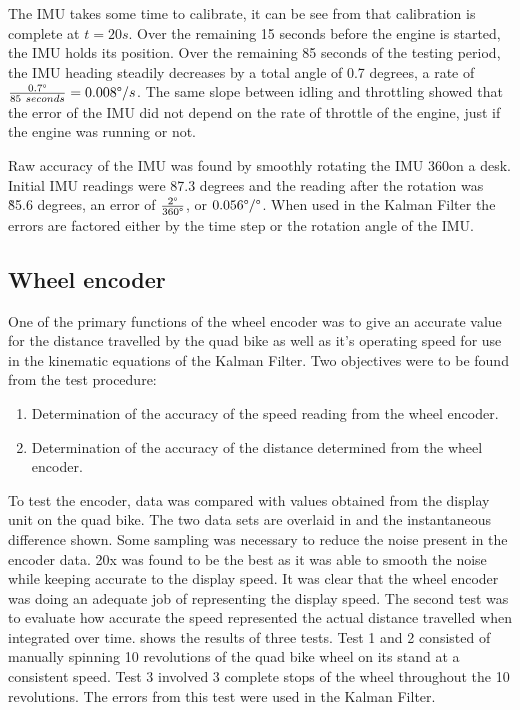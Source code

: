\documentclass[main.tex]{subfiles}
\begin{document}
The IMU takes some time to calibrate, it can be see from  that calibration is complete at $t=20s$. Over the remaining 15 seconds before the engine is started, the IMU holds its position. Over the remaining 85 seconds of the testing period, the IMU heading steadily decreases by a total angle of 0.7 degrees, a rate of $\frac{0.7\degree}{85\ seconds} = 0.008 \degree/s$. The same slope between idling and throttling showed that the error of the IMU did not depend on the rate of throttle of the engine, just if the engine was running or not.

Raw accuracy of the IMU was found by smoothly rotating the IMU 360\degree on a desk. Initial IMU readings were 87.3 degrees and the reading after the rotation was \~85.6 degrees, an error of $\frac{2\degree}{360\degree}$, or $0.056\degree/\degree$. When used in the Kalman Filter the errors are factored either by the time step or the rotation angle of the IMU.

\subsection{Wheel encoder}
One of the primary functions of the wheel encoder was to give an accurate value for the distance travelled by the quad bike as well as it's operating speed for use in the kinematic equations of the Kalman Filter. Two objectives were to be found from the test procedure:
\begin{enumerate}
\item Determination of the accuracy of the speed reading from the wheel encoder.
\item Determination of the accuracy of the distance determined from the wheel encoder.
\end{enumerate}
To test the encoder, data was compared with values obtained from the display unit on the quad bike. The two data sets are overlaid in  and the instantaneous difference shown. Some sampling was necessary to reduce the noise present in the encoder data. 20x was found to be the best as it was able to smooth the noise while keeping accurate to the display speed. It was clear that the wheel encoder was doing an adequate job of representing the display speed. The second test was to evaluate how accurate the speed represented the actual distance travelled when integrated over time.  shows the results of three tests. Test 1 and 2 consisted of manually spinning 10 revolutions of the quad bike wheel on its stand at a consistent speed. Test 3 involved 3 complete stops of the wheel throughout the 10 revolutions. The errors from this test were used in the Kalman Filter.
\end{document}
